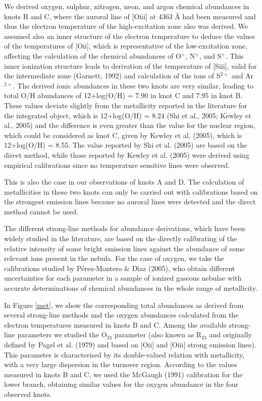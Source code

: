 \documentclass[structabstract]{aa}
\begin{document}
We derived oxygen, sulphur, nitrogen, neon, and argon chemical abundances in knots B and C, where
the auroral line of [O{\sc iii}] at 4363 {\AA} had been measured and thus the electron temperature of the high-excitation zone
also was derived. We assumed also an inner structure of the electron
temperature to deduce the values of the temperatures of [O{\sc ii}], which is representative of the low-excitation
zone, affecting the calculation of the chemical abundances of O$^+$, N$^+$, and S$^+$. This inner ionization
structure leads to derivation of the temperature of [S{\sc iii}], 
valid for the intermediate zone (Garnett, 1992) and calculation of the ions of S$^{2+}$ and Ar$^{2+}$. 
The derived ionic abundances in these two knots
are very similar, leading to total O/H abundances of 12+log(O/H) = 7.90 in knot C and 7.95 in knot B.
These values deviate slightly from the metallicity reported in the literature for
the integrated object, which is 12+log(O/H) = 8.24 (Shi et al., 2005; Kewley et al., 2005) and the difference is even greater than 
the value for the nuclear region, which could be considered as knot C, given by Kewley et al. (2005), which is 12+log(O/H) = 8.55. The value
reported by Shi et al. (2005) are based on the direct method, while those reported by Kewley et al. (2005) were derived using empirical calibrations since no temperature sensitive lines were observed.

This is also the case in our observations of knots A and D. The calculation of metallicities in these two knots can only be carried out with  calibrations based on
the strongest emission lines because no auroral lines were detected and the direct method cannot be used. 

The different strong-line methods for abundance derivations, which have been
widely studied in the literature, are based on the directly calibrating of the relative
intensity of some bright emission lines against the abundance of some relevant ions
present in the nebula. For the case of oxygen, 
we take the calibrations studied by
P\'erez-Montero \& D\'\i az (2005), who obtain different uncertainties for each parameter
in a sample of ionized gaseous nebulae with accurate determinations of chemical abundances
in the whole range of metallicity. 
 
In Figure \ref{met}, we show the corresponding total abundances as derived from several strong-line methods and the oxygen abundances calculated from the electron
temperatures measured in knots B and C.
Among the available strong-line parameters we studied the O$_{23}$ parameter (also known
as R$_{23}$ and originally defined by Pagel et al. (1979) and based on [O{\sc ii}] and [O{\sc iii}] strong emission lines). This parameter is characterised by
its double-valued relation with metallicity, with a very large dispersion in the turnover region. According to the values measured in knots B and C, we used the McGaugh (1991) calibration for the lower branch, obtaining similar values for the oxygen abundance in the four observed knots.
\end{document}

